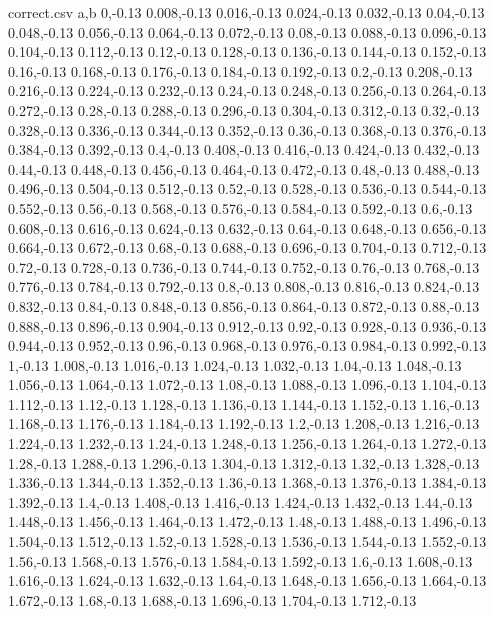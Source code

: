 \begin{filecontents*}{correct.csv}
a,b
0,-0.13
0.008,-0.13
0.016,-0.13
0.024,-0.13
0.032,-0.13
0.04,-0.13
0.048,-0.13
0.056,-0.13
0.064,-0.13
0.072,-0.13
0.08,-0.13
0.088,-0.13
0.096,-0.13
0.104,-0.13
0.112,-0.13
0.12,-0.13
0.128,-0.13
0.136,-0.13
0.144,-0.13
0.152,-0.13
0.16,-0.13
0.168,-0.13
0.176,-0.13
0.184,-0.13
0.192,-0.13
0.2,-0.13
0.208,-0.13
0.216,-0.13
0.224,-0.13
0.232,-0.13
0.24,-0.13
0.248,-0.13
0.256,-0.13
0.264,-0.13
0.272,-0.13
0.28,-0.13
0.288,-0.13
0.296,-0.13
0.304,-0.13
0.312,-0.13
0.32,-0.13
0.328,-0.13
0.336,-0.13
0.344,-0.13
0.352,-0.13
0.36,-0.13
0.368,-0.13
0.376,-0.13
0.384,-0.13
0.392,-0.13
0.4,-0.13
0.408,-0.13
0.416,-0.13
0.424,-0.13
0.432,-0.13
0.44,-0.13
0.448,-0.13
0.456,-0.13
0.464,-0.13
0.472,-0.13
0.48,-0.13
0.488,-0.13
0.496,-0.13
0.504,-0.13
0.512,-0.13
0.52,-0.13
0.528,-0.13
0.536,-0.13
0.544,-0.13
0.552,-0.13
0.56,-0.13
0.568,-0.13
0.576,-0.13
0.584,-0.13
0.592,-0.13
0.6,-0.13
0.608,-0.13
0.616,-0.13
0.624,-0.13
0.632,-0.13
0.64,-0.13
0.648,-0.13
0.656,-0.13
0.664,-0.13
0.672,-0.13
0.68,-0.13
0.688,-0.13
0.696,-0.13
0.704,-0.13
0.712,-0.13
0.72,-0.13
0.728,-0.13
0.736,-0.13
0.744,-0.13
0.752,-0.13
0.76,-0.13
0.768,-0.13
0.776,-0.13
0.784,-0.13
0.792,-0.13
0.8,-0.13
0.808,-0.13
0.816,-0.13
0.824,-0.13
0.832,-0.13
0.84,-0.13
0.848,-0.13
0.856,-0.13
0.864,-0.13
0.872,-0.13
0.88,-0.13
0.888,-0.13
0.896,-0.13
0.904,-0.13
0.912,-0.13
0.92,-0.13
0.928,-0.13
0.936,-0.13
0.944,-0.13
0.952,-0.13
0.96,-0.13
0.968,-0.13
0.976,-0.13
0.984,-0.13
0.992,-0.13
1,-0.13
1.008,-0.13
1.016,-0.13
1.024,-0.13
1.032,-0.13
1.04,-0.13
1.048,-0.13
1.056,-0.13
1.064,-0.13
1.072,-0.13
1.08,-0.13
1.088,-0.13
1.096,-0.13
1.104,-0.13
1.112,-0.13
1.12,-0.13
1.128,-0.13
1.136,-0.13
1.144,-0.13
1.152,-0.13
1.16,-0.13
1.168,-0.13
1.176,-0.13
1.184,-0.13
1.192,-0.13
1.2,-0.13
1.208,-0.13
1.216,-0.13
1.224,-0.13
1.232,-0.13
1.24,-0.13
1.248,-0.13
1.256,-0.13
1.264,-0.13
1.272,-0.13
1.28,-0.13
1.288,-0.13
1.296,-0.13
1.304,-0.13
1.312,-0.13
1.32,-0.13
1.328,-0.13
1.336,-0.13
1.344,-0.13
1.352,-0.13
1.36,-0.13
1.368,-0.13
1.376,-0.13
1.384,-0.13
1.392,-0.13
1.4,-0.13
1.408,-0.13
1.416,-0.13
1.424,-0.13
1.432,-0.13
1.44,-0.13
1.448,-0.13
1.456,-0.13
1.464,-0.13
1.472,-0.13
1.48,-0.13
1.488,-0.13
1.496,-0.13
1.504,-0.13
1.512,-0.13
1.52,-0.13
1.528,-0.13
1.536,-0.13
1.544,-0.13
1.552,-0.13
1.56,-0.13
1.568,-0.13
1.576,-0.13
1.584,-0.13
1.592,-0.13
1.6,-0.13
1.608,-0.13
1.616,-0.13
1.624,-0.13
1.632,-0.13
1.64,-0.13
1.648,-0.13
1.656,-0.13
1.664,-0.13
1.672,-0.13
1.68,-0.13
1.688,-0.13
1.696,-0.13
1.704,-0.13
1.712,-0.13

\end{filecontents*}
